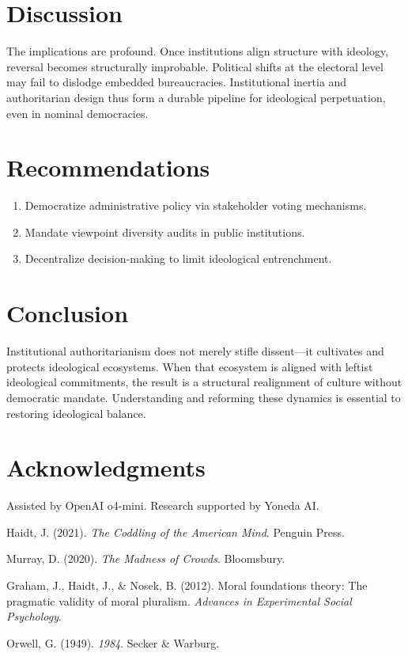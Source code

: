 \documentclass[11pt]{article}
\begin{document}
\section{Discussion}

The implications are profound. Once institutions align structure with ideology, reversal becomes structurally improbable. Political shifts at the electoral level may fail to dislodge embedded bureaucracies. Institutional inertia and authoritarian design thus form a durable pipeline for ideological perpetuation, even in nominal democracies.

\section{Recommendations}

\begin{enumerate}
    \item Democratize administrative policy via stakeholder voting mechanisms.
    \item Mandate viewpoint diversity audits in public institutions.
    \item Decentralize decision-making to limit ideological entrenchment.
\end{enumerate}

\section{Conclusion}

Institutional authoritarianism does not merely stifle dissent—it cultivates and protects ideological ecosystems. When that ecosystem is aligned with leftist ideological commitments, the result is a structural realignment of culture without democratic mandate. Understanding and reforming these dynamics is essential to restoring ideological balance.

\section*{Acknowledgments}

Assisted by OpenAI o4-mini. Research supported by Yoneda AI.


\begin{thebibliography}{9}

Haidt, J. (2021). \textit{The Coddling of the American Mind}. Penguin Press.

Murray, D. (2020). \textit{The Madness of Crowds}. Bloomsbury.

Graham, J., Haidt, J., \& Nosek, B. (2012). Moral foundations theory: The pragmatic validity of moral pluralism. \textit{Advances in Experimental Social Psychology}.

Orwell, G. (1949). \textit{1984}. Secker \& Warburg.

\end{thebibliography}
\end{document}
